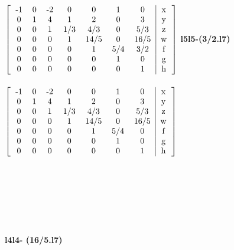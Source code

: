\documentclass{article}
\begin{document}
\begin{hbox}{

$\left[
\begin{tabular}{ccccccc|c}
-1 & 0 & -2 & 0 & 0 & 1 & 0 & x\\
0 & 1 & 4 & 1 & 2 & 0 & 3 & y\\
0 & 0 & 1 & 1/3 & 4/3 & 0 & 5/3 & z\\
0 & 0 & 0 & 1 & 14/5 & 0 & 16/5 & w\\
0 & 0 & 0 & 0 & 1 & 5/4 & 3/2 & f\\
0 & 0 & 0 & 0 & 0 & 1 & 0 & g\\
0 & 0 & 0 & 0 & 0 & 0 & 1 & h\\
\end{tabular}
\right]

$
\textbf{l5\rightarrow l5-(3/2.l7)}
\\\\
$\left[
\begin{tabular}{ccccccc|c}
-1 & 0 & -2 & 0 & 0 & 1 & 0 & x\\
0 & 1 & 4 & 1 & 2 & 0 & 3 & y\\
0 & 0 & 1 & 1/3 & 4/3 & 0 & 5/3 & z\\
0 & 0 & 0 & 1 & 14/5 & 0 & 16/5 & w\\
0 & 0 & 0 & 0 & 1 & 5/4 & 0 & f\\
0 & 0 & 0 & 0 & 0 & 1 & 0 & g\\
0 & 0 & 0 & 0 & 0 & 0 & 1 & h\\
\end{tabular}
\right]\\
$}
\end{hbox}\\
\\\\\\\\\\
\textbf{l4\rightarrow l4- (16/5.l7)}
\end{document}
